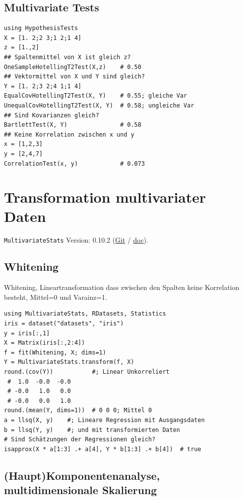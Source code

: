 \documentclass[10pt,twocolumn]{scrartcl}
\begin{document}
\subsection{Multivariate Tests}

\begin{lstlisting}
using HypothesisTests
X = [1. 2;2 3;1 2;1 4]
z = [1.,2]
## Spaltenmittel von X ist gleich z?
OneSampleHotellingT2Test(X,z)    # 0.50
## Vektormittel von X und Y sind gleich?
Y = [1. 2;3 2;4 1;1 4]
EqualCovHotellingT2Test(X, Y)    # 0.55; gleiche Var
UnequalCovHotellingT2Test(X, Y)  # 0.58; ungleiche Var
## Sind Kovarianzen gleich?
BartlettTest(X, Y)               # 0.58
## Keine Korrelation zwischen x und y
x = [1,2,3]
y = [2,4,7]
CorrelationTest(x, y)            # 0.073
\end{lstlisting}

\section{Transformation multivariater Daten}

\lstinline|MultivariateStats|
 Version: 0.10.2
(\href{https://github.com/JuliaStats/MultivariateStats.jl}{Git} /
\href{https://juliastats.org/MultivariateStats.jl}{doc}).

\subsection{Whitening}

Whitening, Lineartransformation dass zwischen den Spalten keine Korrelation
besteht, Mittel=0 und Varainz=1.

\begin{lstlisting}
using MultivariateStats, RDatasets, Statistics
iris = dataset("datasets", "iris")
y = iris[:,1]
X = Matrix(iris[:,2:4])
f = fit(Whitening, X; dims=1)
Y = MultivariateStats.transform(f, X)
round.(cov(Y))           #; Linear Unkorreliert
 #  1.0  -0.0  -0.0
 # -0.0   1.0   0.0
 # -0.0   0.0   1.0
round.(mean(Y, dims=1))  # 0 0 0; Mittel 0
a = llsq(X, y)    #; Lineare Regression mit Ausgangsdaten
b = llsq(Y, y)    #; und mit transformierten Daten
# Sind Schätzungen der Regressionen gleich?
isapprox(X * a[1:3] .+ a[4], Y * b[1:3] .+ b[4])  # true
\end{lstlisting}

\subsection{(Haupt)Komponentenanalyse, multidimensionale Skalierung}
\end{document}
